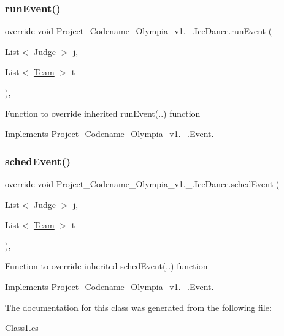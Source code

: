 \subsubsection{\texorpdfstring{run\+Event()}{runEvent()}}
{\footnotesize\ttfamily override void Project\+\_\+\+Codename\+\_\+\+Olympia\+\_\+v1.\+\_.\+Ice\+Dance.\+run\+Event (\begin{DoxyParamCaption}\item[{List$<$ \hyperlink{classProject__Codename__Olympia__v1_1_1__0_1_1Judge}{Judge} $>$}]{j,  }\item[{List$<$ \hyperlink{classProject__Codename__Olympia__v1_1_1__0_1_1Team}{Team} $>$}]{t }\end{DoxyParamCaption})\hspace{0.3cm}{\ttfamily [inline]}, {\ttfamily [virtual]}}

Function to override inherited run\+Event(..) function 

Implements \hyperlink{classProject__Codename__Olympia__v1_1_1__0_1_1Event_ac6ff060da23153c02da49937dcf9f326}{Project\+\_\+\+Codename\+\_\+\+Olympia\+\_\+v1.\+\_.\+Event}.

\mbox{\label{classProject__Codename__Olympia__v1_1_1__0_1_1IceDance_ac95be9763d66943baf87f4533b9b2e64}} 
\subsubsection{\texorpdfstring{sched\+Event()}{schedEvent()}}
{\footnotesize\ttfamily override void Project\+\_\+\+Codename\+\_\+\+Olympia\+\_\+v1.\+\_.\+Ice\+Dance.\+sched\+Event (\begin{DoxyParamCaption}\item[{List$<$ \hyperlink{classProject__Codename__Olympia__v1_1_1__0_1_1Judge}{Judge} $>$}]{j,  }\item[{List$<$ \hyperlink{classProject__Codename__Olympia__v1_1_1__0_1_1Team}{Team} $>$}]{t }\end{DoxyParamCaption})\hspace{0.3cm}{\ttfamily [inline]}, {\ttfamily [virtual]}}

Function to override inherited sched\+Event(..) function 

Implements \hyperlink{classProject__Codename__Olympia__v1_1_1__0_1_1Event_abb4e2b9c28527b9a28395f2fe9192196}{Project\+\_\+\+Codename\+\_\+\+Olympia\+\_\+v1.\+\_.\+Event}.



The documentation for this class was generated from the following file\+:\begin{DoxyCompactItemize}
\item 
Class1.\+cs\end{DoxyCompactItemize}
